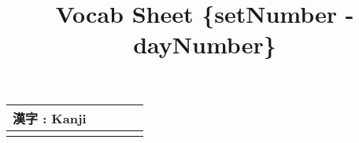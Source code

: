 \documentclass{article}
\title{Vocab Sheet \{setNumber - dayNumber\}}
\begin{document}
	\maketitle
	\begin{CJK}{UTF8}{min}
		\begin{center}
			\begin{tabular}{|p{4.0cm} | p{2.5cm} | p{2.5cm} | p{2.5cm} | p{2.5cm} |}
				\hline
				漢字 : Kanji & & & &\\
				\hline
				 & & & & \\
				\hline
			\end{tabular}
		\end{center}
	\end{CJK}
\end{document}
